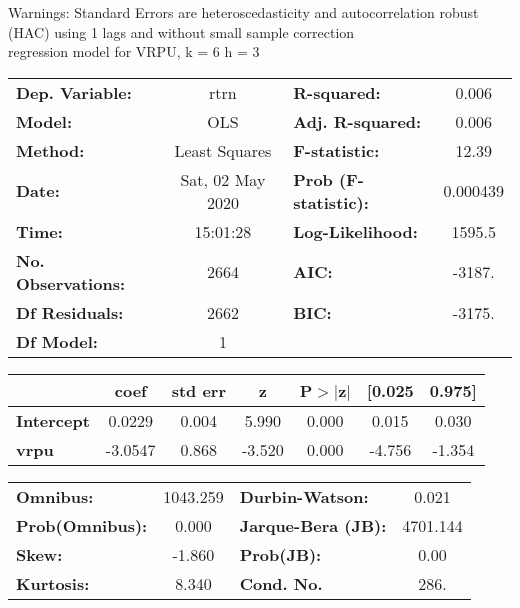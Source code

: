 Warnings: \newline
 [1] Standard Errors are heteroscedasticity and autocorrelation robust (HAC) using 1 lags and without small sample correction\\ 

regression model for VRPU, k = 6 h = 3\begin{center}
\begin{tabular}{lclc}
\toprule
\textbf{Dep. Variable:}    &       rtrn       & \textbf{  R-squared:         } &     0.006   \\
\textbf{Model:}            &       OLS        & \textbf{  Adj. R-squared:    } &     0.006   \\
\textbf{Method:}           &  Least Squares   & \textbf{  F-statistic:       } &     12.39   \\
\textbf{Date:}             & Sat, 02 May 2020 & \textbf{  Prob (F-statistic):} &  0.000439   \\
\textbf{Time:}             &     15:01:28     & \textbf{  Log-Likelihood:    } &    1595.5   \\
\textbf{No. Observations:} &        2664      & \textbf{  AIC:               } &    -3187.   \\
\textbf{Df Residuals:}     &        2662      & \textbf{  BIC:               } &    -3175.   \\
\textbf{Df Model:}         &           1      & \textbf{                     } &             \\
\bottomrule
\end{tabular}
\begin{tabular}{lcccccc}
                   & \textbf{coef} & \textbf{std err} & \textbf{z} & \textbf{P$> |$z$|$} & \textbf{[0.025} & \textbf{0.975]}  \\
\midrule
\textbf{Intercept} &       0.0229  &        0.004     &     5.990  &         0.000        &        0.015    &        0.030     \\
\textbf{vrpu}      &      -3.0547  &        0.868     &    -3.520  &         0.000        &       -4.756    &       -1.354     \\
\bottomrule
\end{tabular}
\begin{tabular}{lclc}
\textbf{Omnibus:}       & 1043.259 & \textbf{  Durbin-Watson:     } &    0.021  \\
\textbf{Prob(Omnibus):} &   0.000  & \textbf{  Jarque-Bera (JB):  } & 4701.144  \\
\textbf{Skew:}          &  -1.860  & \textbf{  Prob(JB):          } &     0.00  \\
\textbf{Kurtosis:}      &   8.340  & \textbf{  Cond. No.          } &     286.  \\
\bottomrule
\end{tabular}
\end{center}

